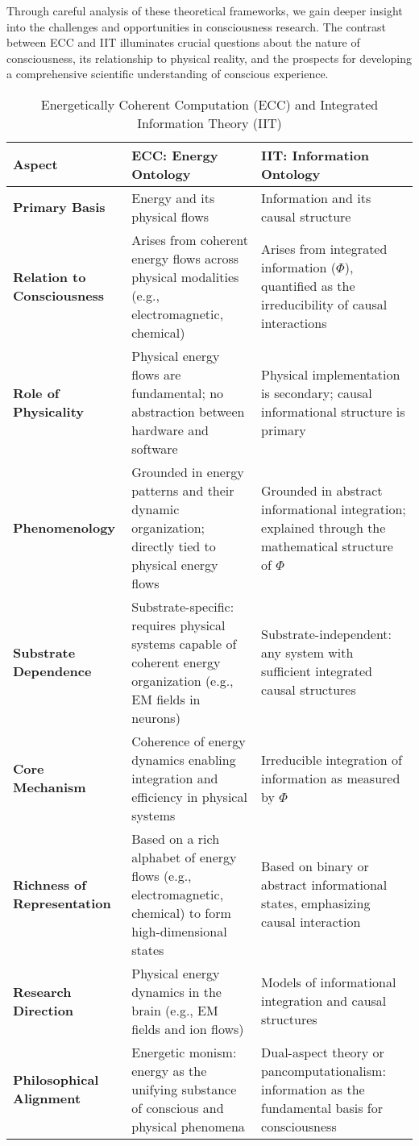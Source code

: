 Through careful analysis of these theoretical frameworks, we gain deeper insight into the challenges and opportunities in consciousness research. The contrast between ECC and IIT illuminates crucial questions about the nature of consciousness, its relationship to physical reality, and the prospects for developing a comprehensive scientific understanding of conscious experience.

\begin{table}[h!]
\centering
\setlength{\extrarowheight}{2pt} %
\begin{tabularx}{\textwidth}{@{}p{3cm}Xp{4cm}@{}}
\toprule
\textbf{Aspect} & \textbf{ECC: Energy Ontology} & \textbf{IIT: Information Ontology} \\ \midrule
\textbf{Primary Basis} & Energy and its physical flows & Information and its causal structure \\
\textbf{Relation to Consciousness} & Arises from coherent energy flows across physical modalities (e.g., electromagnetic, chemical) & Arises from integrated information ($\Phi$), quantified as the irreducibility of causal interactions \\
\textbf{Role of Physicality} & Physical energy flows are fundamental; no abstraction between hardware and software & Physical implementation is secondary; causal informational structure is primary \\
\textbf{Phenomenology} & Grounded in energy patterns and their dynamic organization; directly tied to physical energy flows & Grounded in abstract informational integration; explained through the mathematical structure of $\Phi$ \\
\textbf{Substrate Dependence} & Substrate-specific: requires physical systems capable of coherent energy organization (e.g., EM fields in neurons) & Substrate-independent: any system with sufficient integrated causal structures \\
\textbf{Core Mechanism} & Coherence of energy dynamics enabling integration and efficiency in physical systems & Irreducible integration of information as measured by $\Phi$ \\
\textbf{Richness of Representation} & Based on a rich alphabet of energy flows (e.g., electromagnetic, chemical) to form high-dimensional states & Based on binary or abstract informational states, emphasizing causal interaction \\
\textbf{Research Direction} & Physical energy dynamics in the brain (e.g., EM fields and ion flows) & Models of informational integration and causal structures \\
\textbf{Philosophical Alignment} & Energetic monism: energy as the unifying substance of conscious and physical phenomena & Dual-aspect theory or pancomputationalism: information as the fundamental basis for consciousness \\ \bottomrule
\end{tabularx}
\caption{Energetically Coherent Computation (ECC) and Integrated Information Theory (IIT)}
\label{tab:ecc_vs_iit}
\end{table}